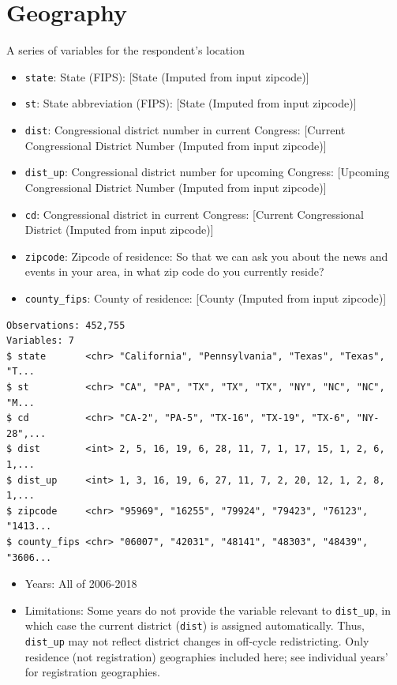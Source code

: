 \documentclass[10pt,article,oneside]{memoir}
\theoremstyle{definition}
\begin{document}
\section{Geography}\label{geography}

A series of variables for the respondent's location

\begin{itemize}
\tightlist
\item
  \texttt{state}: State (FIPS): {[}State (Imputed from input zipcode){]}
\item
  \texttt{st}: State abbreviation (FIPS): {[}State (Imputed from input
  zipcode){]}
\item
  \texttt{dist}: Congressional district number in current Congress:
  {[}Current Congressional District Number (Imputed from input
  zipcode){]}
\item
  \texttt{dist\_up}: Congressional district number for upcoming
  Congress: {[}Upcoming Congressional District Number (Imputed from
  input zipcode){]}
\item
  \texttt{cd}: Congressional district in current Congress: {[}Current
  Congressional District (Imputed from input zipcode){]}
\item
  \texttt{zipcode}: Zipcode of residence: So that we can ask you about
  the news and events in your area, in what zip code do you currently
  reside?
\item
  \texttt{county\_fips}: County of residence: {[}County (Imputed from
  input zipcode){]}
\end{itemize}

\begin{verbatim}
Observations: 452,755
Variables: 7
$ state       <chr> "California", "Pennsylvania", "Texas", "Texas", "T...
$ st          <chr> "CA", "PA", "TX", "TX", "TX", "NY", "NC", "NC", "M...
$ cd          <chr> "CA-2", "PA-5", "TX-16", "TX-19", "TX-6", "NY-28",...
$ dist        <int> 2, 5, 16, 19, 6, 28, 11, 7, 1, 17, 15, 1, 2, 6, 1,...
$ dist_up     <int> 1, 3, 16, 19, 6, 27, 11, 7, 2, 20, 12, 1, 2, 8, 1,...
$ zipcode     <chr> "95969", "16255", "79924", "79423", "76123", "1413...
$ county_fips <chr> "06007", "42031", "48141", "48303", "48439", "3606...
\end{verbatim}

\begin{itemize}
\tightlist
\item
  Years: All of 2006-2018
\item
  Limitations: Some years do not provide the variable relevant to
  \texttt{dist\_up}, in which case the current district (\texttt{dist})
  is assigned automatically. Thus, \texttt{dist\_up} may not reflect
  district changes in off-cycle redistricting. Only residence (not
  registration) geographies included here; see individual years' for
  registration geographies.
\end{itemize}
\end{document}
